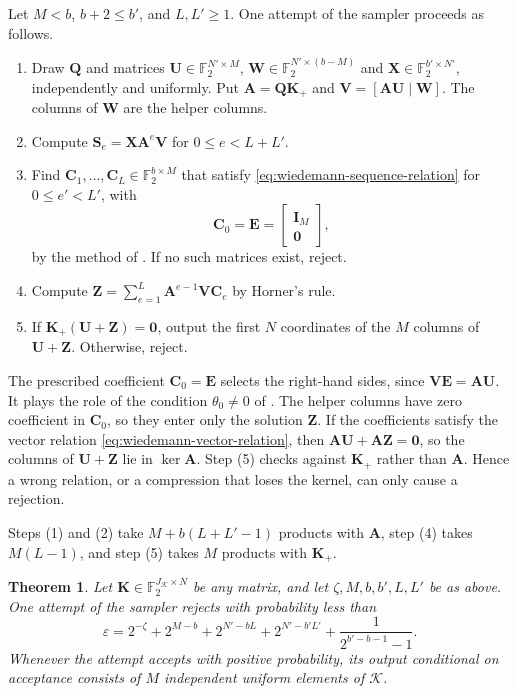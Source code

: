 \documentclass[b5paper, 10pt, abstract=true, captions=tableheading]{scrartcl}
\theoremstyle{plain}
\newtheorem{theorem}{Theorem}
\theoremstyle{definition}
\newcommand{\FF}{\mathds{F}}
\newcommand{\mat}[1]{\symbf{#1}}
\newcommand{\calK}{\mathcal{K}}
\begin{document}
Let $M<b$, $b+2\leq b'$, and $L,L'\geq1$. One attempt of the sampler
proceeds as follows.
\begin{enumerate}[(1)]
  \item Draw $\mat Q$ and matrices $\mat U\in\FF_2^{N'\times M}$,
  $\mat W\in\FF_2^{N'\times(b-M)}$ and $\mat X\in\FF_2^{b'\times N'}$,
  independently and uniformly. Put $\mat A=\mat Q\mat K_+$ and
  $\mat V=[\mat A\mat U\mid\mat W]$. The columns of $\mat W$ are the
  helper columns.
  \item Compute $\mat S_e=\mat X\mat A^e\mat V$ for $0\leq e<L+L'$.
  \item Find $\mat C_1,\ldots,\mat C_L\in\FF_2^{b\times M}$ that satisfy
  \eqref{eq:wiedemann-sequence-relation} for $0\leq e'<L'$, with
  \[
    \mat C_0=\mat E=\begin{bmatrix}\mat I_M\\\mat 0\end{bmatrix},
  \]
  by the method of . If no such matrices
  exist, reject.
  \item Compute
  $\mat Z=\sum_{e=1}^{L}\mat A^{e-1}\mat V\mat C_e$ by Horner's rule.
  \item If $\mat K_+(\mat U+\mat Z)=\mat 0$, output the first $N$
  coordinates of the $M$ columns of $\mat U+\mat Z$. Otherwise, reject.
\end{enumerate}
The prescribed coefficient $\mat C_0=\mat E$ selects the right-hand sides,
since $\mat V\mat E=\mat A\mat U$. It plays the role of the condition
$\theta_0\neq0$ of . The helper columns have
zero coefficient in $\mat C_0$, so they enter only the solution $\mat Z$.
If the coefficients satisfy the vector relation
\eqref{eq:wiedemann-vector-relation}, then $\mat A\mat U+\mat A\mat Z=\mat
0$, so the columns of $\mat U+\mat Z$ lie in $\ker\mat A$. Step (5) checks
against $\mat K_+$ rather than $\mat A$. Hence a wrong relation, or a
compression that loses the kernel, can only cause a rejection.

Steps (1) and (2) take $M+b(L+L'-1)$ products with $\mat A$, step (4)
takes $M(L-1)$, and step (5) takes $M$ products with $\mat K_+$.

\begin{theorem}\label{thm:wiedemann-sampler}
Let $\mat K\in\FF_2^{J_{\calK}\times N}$ be any matrix, and let
$\zeta,M,b,b',L,L'$ be as above. One attempt of the sampler rejects with
probability less than
\[
  \varepsilon
  =2^{-\zeta}+2^{M-b}+2^{N'-bL}+2^{N'-b'L'}
   +\frac1{2^{b'-b-1}-1}.
\]
Whenever the attempt accepts with positive probability, its output
conditional on acceptance consists of $M$ independent uniform elements of
$\calK$.
\end{theorem}
\end{document}
